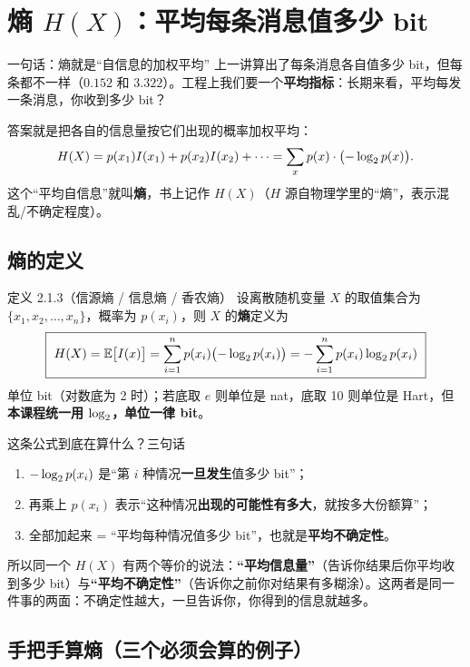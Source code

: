 \section{熵 $H(X)$：平均每条消息值多少 bit}

\begin{idea}{一句话：熵就是“自信息的加权平均”}
上一讲算出了每条消息各自值多少 bit，但每条都不一样（$0.152$ 和 $3.322$）。工程上我们要一个\textbf{平均指标}：长期来看，平均每发一条消息，你收到多少 bit？

答案就是把各自的信息量按它们出现的概率加权平均：
\[
H\!\left(X\right)=p(x_1)I(x_1)+p(x_2)I(x_2)+\cdots=\sum_x p(x)\cdot\bigl(-\log_{2} p(x)\bigr).
\]
这个“平均自信息”就叫\textbf{熵}，书上记作 $H(X)$（$H$ 源自物理学里的“熵”，表示混乱/不确定程度）。
\end{idea}

\subsection{熵的定义}

\begin{defbox}{定义 2.1.3（信源熵 / 信息熵 / 香农熵）}
设离散随机变量 $X$ 的取值集合为 $\{x_1,x_2,\dots,x_n\}$，概率为 $p(x_i)$，则 $X$ 的\textbf{熵}定义为
\[
\boxed{\ \Hx{X}=\E\bigl[I(x)\bigr]=\sum_{i=1}^{n}p(x_i)\bigl(-\lb p(x_i)\bigr)
=-\sum_{i=1}^{n}p(x_i)\lb p(x_i)\ }
\]
单位 bit（对数底为 2 时）；若底取 $e$ 则单位是 nat，底取 10 则单位是 Hart，但\textbf{本课程统一用 $\log_{2}$，单位一律 bit}。
\end{defbox}

\begin{qa}{这条公式到底在算什么？三句话}
\begin{enumerate}[leftmargin=1.6em,itemsep=1pt,topsep=2pt]
  \item $-\log_{2} p(x_i)$ 是“第 $i$ 种情况\textbf{一旦发生}值多少 bit”；
  \item 再乘上 $p(x_i)$ 表示“这种情况\textbf{出现的可能性有多大}，就按多大份额算”；
  \item 全部加起来 = “平均每种情况值多少 bit”，也就是\textbf{平均不确定性}。
\end{enumerate}
所以同一个 $H(X)$ 有两个等价的说法：\textbf{“平均信息量”}（告诉你结果后你平均收到多少 bit）与\textbf{“平均不确定性”}（告诉你之前你对结果有多糊涂）。这两者是同一件事的两面：不确定性越大，一旦告诉你，你得到的信息就越多。
\end{qa}

\subsection{手把手算熵（三个必须会算的例子）}

